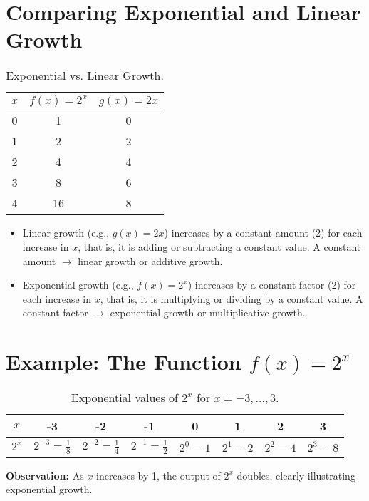 \section{Comparing Exponential and Linear Growth}
\begin{table}[ht]
  \centering
  \begin{tabular}{c|c|c}
    \(x\) & \(f(x)=2^x\) & \(g(x)=2x\) \\ \hline
    0 & 1 & 0 \\
    1 & 2 & 2 \\
    2 & 4 & 4 \\
    3 & 8 & 6 \\
    4 & 16 & 8 \\
  \end{tabular}
  \caption{Exponential vs. Linear Growth.}
\end{table}
\begin{itemize}
  \item Linear growth (e.g., \(g(x)=2x\)) increases by a constant amount (2) for each increase in \(x\), that is, it is adding or subtracting a constant value. A constant amount \( \rightarrow \) linear growth or additive growth.
  \item Exponential growth (e.g., \(f(x)=2^x\)) increases by a constant factor (2) for each increase in \(x\), that is, it is multiplying or dividing by a constant value. A constant factor \( \rightarrow \) exponential growth or multiplicative growth.
\end{itemize}

\section{Example: The Function \(f(x)=2^x\)}
\begin{table}[ht]
  \centering
  \begin{tabular}{|c|c|c|c|c|c|c|c|}
    \hline
    \(x\)      & -3 & -2 & -1 & 0 & 1 & 2 & 3 \\ \hline
    \(2^x\) & \(2^{-3}=\frac{1}{8}\) & \(2^{-2}=\frac{1}{4}\) & \(2^{-1}=\frac{1}{2}\) & \(2^0=1\) & \(2^1=2\) & \(2^2=4\) & \(2^3=8\) \\ \hline
  \end{tabular}
  \caption{Exponential values of \(2^x\) for \(x=-3,\dots,3\).}
\end{table}
\textbf{Observation:} As \(x\) increases by 1, the output of \(2^x\) doubles, clearly illustrating exponential growth.

